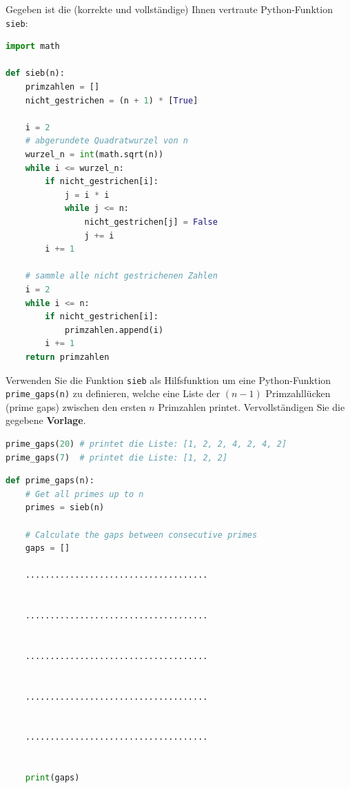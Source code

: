 \begin{questions}

	\question[2]
	Gegeben ist die (korrekte und vollständige) Ihnen vertraute Python-Funktion \lstinline|sieb|:
	\begin{lstlisting}[language=Python,caption=Sieb,numbers=none]
import math

def sieb(n):
    primzahlen = []
    nicht_gestrichen = (n + 1) * [True]

    i = 2
    # abgerundete Quadratwurzel von n
    wurzel_n = int(math.sqrt(n))
    while i <= wurzel_n:
        if nicht_gestrichen[i]:
            j = i * i
            while j <= n:
                nicht_gestrichen[j] = False
                j += i
        i += 1

    # sammle alle nicht gestrichenen Zahlen
    i = 2
    while i <= n:
        if nicht_gestrichen[i]:
            primzahlen.append(i)
        i += 1
    return primzahlen
\end{lstlisting}
	Verwenden Sie die Funktion \lstinline|sieb| als Hilfsfunktion um eine Python-Funktion \lstinline|prime_gaps(n)| zu definieren, welche eine Liste der $(n - 1)$ Primzahllücken (prime gaps) zwischen den ersten $n$ Primzahlen printet. Vervollständigen Sie die gegebene \textbf{Vorlage}.

	\begin{lstlisting}[language=Python,caption=Beispiele,numbers=none]
prime_gaps(20) # printet die Liste: [1, 2, 2, 4, 2, 4, 2]
prime_gaps(7)  # printet die Liste: [1, 2, 2]
\end{lstlisting}

	\clearpage

	\begin{lstlisting}[language=Python,caption=prime gaps (noch zu vervollständigen),numbers=none]
def prime_gaps(n):
    # Get all primes up to n
    primes = sieb(n)

    # Calculate the gaps between consecutive primes
    gaps = []

    ..................................... 
    

    ..................................... 
    

    ..................................... 


    ..................................... 
    

    ..................................... 
    

    print(gaps)
\end{lstlisting}

\end{questions}

